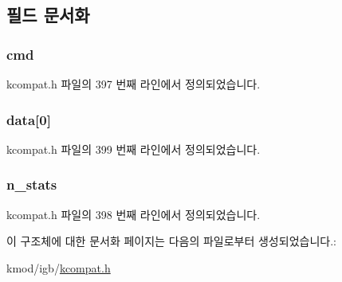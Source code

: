 \subsection{필드 문서화}
\subsubsection[{\texorpdfstring{cmd}{cmd}}]{ cmd}\hypertarget{structethtool__stats_a62fe2a1dbf17d5a8561a5a7f5a97a9ba}{}\label{structethtool__stats_a62fe2a1dbf17d5a8561a5a7f5a97a9ba}


kcompat.\+h 파일의 397 번째 라인에서 정의되었습니다.

\subsubsection[{\texorpdfstring{data}{data}}]{ data\mbox{[}0\mbox{]}}\hypertarget{structethtool__stats_ae94c28f3505a41fa45aad7ce037322f5}{}\label{structethtool__stats_ae94c28f3505a41fa45aad7ce037322f5}


kcompat.\+h 파일의 399 번째 라인에서 정의되었습니다.

\subsubsection[{\texorpdfstring{n\+\_\+stats}{n_stats}}]{ n\+\_\+stats}\hypertarget{structethtool__stats_a2b16bc73f229056a84b161491538fedd}{}\label{structethtool__stats_a2b16bc73f229056a84b161491538fedd}


kcompat.\+h 파일의 398 번째 라인에서 정의되었습니다.



이 구조체에 대한 문서화 페이지는 다음의 파일로부터 생성되었습니다.\+:\begin{DoxyCompactItemize}
\item 
kmod/igb/\hyperlink{kcompat_8h}{kcompat.\+h}\end{DoxyCompactItemize}

